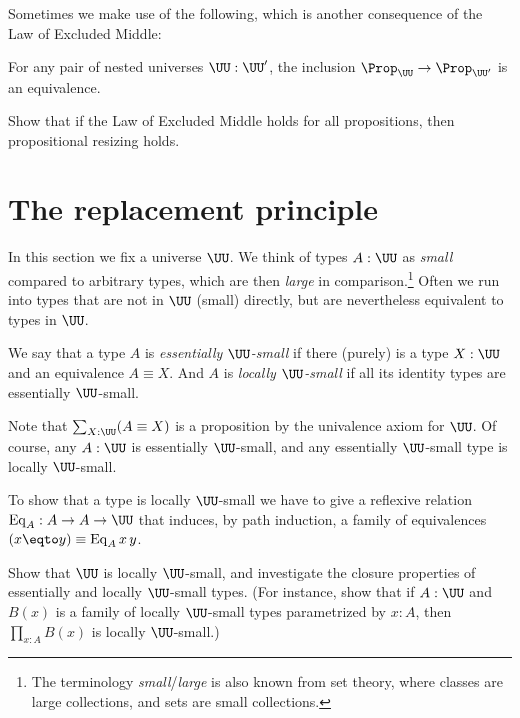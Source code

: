 Sometimes we make use of the following,
which is another consequence of the Law of Excluded Middle:
\begin{principle}
  \label{pri:prop-resizing}
  For any pair of nested universes $\UU:\UU'$, the inclusion
  $\Prop_\UU \to \Prop_{\UU'}$ is an equivalence.
\end{principle}
\begin{xca}\label{xca:lem-prop-sizing}
  Show that if the Law of Excluded Middle holds for all propositions,
  then propositional resizing holds.
\end{xca}


\section{The replacement principle}
\label{sec:replacement}

In this section we fix a universe $\UU$.
We think of types $A:\UU$ as \emph{small} compared to arbitrary types,
which are then \emph{large} in comparison.\footnote{%
  The terminology \emph{small}/\emph{large} is also known from set theory,
  where classes are large collections,
  and sets are small collections.}
Often we run into types that are not in $\UU$ (small) directly,
but are nevertheless equivalent to types in $\UU$.
\begin{definition}\label{def:ess-loc-small}
  We say that a type $A$ is \emph{essentially $\UU$-small} if there
  (purely) is a type $X:\UU$ and an equivalence $A \equiv
  X$. And $A$ is \emph{locally $\UU$-small} if all its identity types
  are essentially $\UU$-small.
\end{definition}
Note that $\sum_{X:\UU}(A \equiv X)$ is a proposition by the univalence axiom for $\UU$.
Of course, any $A:\UU$ is essentially $\UU$-small,
and any essentially $\UU$-small type is locally $\UU$-small.

To show that a type is locally $\UU$-small
we have to give a reflexive relation
$\mathrm{Eq}_A : A \to A \to \UU$
that induces, by path induction, a family of equivalences
$(x \eqto y) \equiv \mathrm{Eq}_A\,x\,y$.

\begin{xca}
  Show that $\UU$ is locally $\UU$-small, and investigate
  the closure properties of essentially and locally $\UU$-small types.
  (For instance, show that if $A:\UU$ and $B(x)$ is a family of locally $\UU$-small
  types parametrized by $x:A$, then $\prod_{x:A}B(x)$ is locally $\UU$-small.)
\end{xca}

